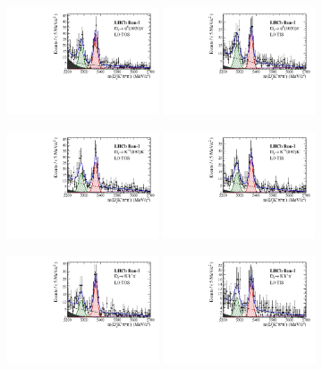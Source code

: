 \begin{figure}[h]
\centering
\includegraphics[height=!,width=0.4\textwidth]{figs/MassFit/signal_Run1_phipi_t0.pdf}
\includegraphics[height=!,width=0.4\textwidth]{figs/MassFit/signal_Run1_phipi_t1.pdf}

\includegraphics[height=!,width=0.4\textwidth]{figs/MassFit/signal_Run1_KsK_t0.pdf}
\includegraphics[height=!,width=0.4\textwidth]{figs/MassFit/signal_Run1_KsK_t1.pdf}

\includegraphics[height=!,width=0.4\textwidth]{figs/MassFit/signal_Run1_KKpi_NR_t0.pdf}
\includegraphics[height=!,width=0.4\textwidth]{figs/MassFit/signal_Run1_KKpi_NR_t1.pdf}


\end{figure}
